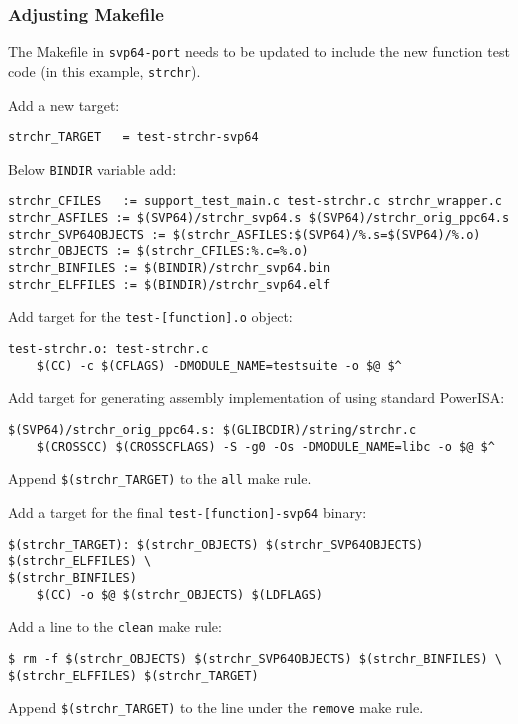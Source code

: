 \subsubsection{Adjusting Makefile}

The Makefile in \texttt{svp64-port} needs to be updated to include the new
function test code (in this example, \texttt{strchr}).

Add a new target:

\begin{verbatim}
strchr_TARGET	= test-strchr-svp64
\end{verbatim}

Below \texttt{BINDIR} variable add:
\begin{verbatim}
strchr_CFILES	:= support_test_main.c test-strchr.c strchr_wrapper.c
strchr_ASFILES := $(SVP64)/strchr_svp64.s $(SVP64)/strchr_orig_ppc64.s
strchr_SVP64OBJECTS := $(strchr_ASFILES:$(SVP64)/%.s=$(SVP64)/%.o)
strchr_OBJECTS := $(strchr_CFILES:%.c=%.o)
strchr_BINFILES := $(BINDIR)/strchr_svp64.bin
strchr_ELFFILES := $(BINDIR)/strchr_svp64.elf
\end{verbatim}

Add target for the \texttt{test-[function].o} object:
\begin{verbatim}
test-strchr.o: test-strchr.c
	$(CC) -c $(CFLAGS) -DMODULE_NAME=testsuite -o $@ $^
\end{verbatim}

Add target for generating assembly implementation of using standard PowerISA:
\begin{verbatim}
$(SVP64)/strchr_orig_ppc64.s: $(GLIBCDIR)/string/strchr.c
	$(CROSSCC) $(CROSSCFLAGS) -S -g0 -Os -DMODULE_NAME=libc -o $@ $^
\end{verbatim}

Append \texttt{\$(strchr\_TARGET)} to the \texttt{all} make rule.

Add a target for the final \texttt{test-[function]-svp64} binary:
\begin{verbatim}
$(strchr_TARGET): $(strchr_OBJECTS) $(strchr_SVP64OBJECTS) $(strchr_ELFFILES) \
$(strchr_BINFILES)
	$(CC) -o $@ $(strchr_OBJECTS) $(LDFLAGS)
\end{verbatim}

Add a line to the \texttt{clean} make rule:
\begin{verbatim}
$ rm -f $(strchr_OBJECTS) $(strchr_SVP64OBJECTS) $(strchr_BINFILES) \
$(strchr_ELFFILES) $(strchr_TARGET)
\end{verbatim}

Append \texttt{\$(strchr\_TARGET)} to the line under the \texttt{remove} make rule.

